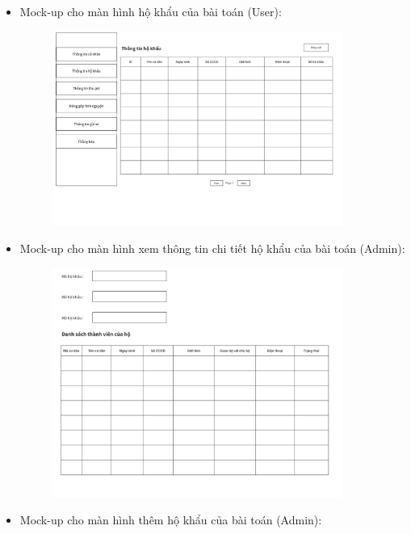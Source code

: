 \documentclass{article}
\begin{document}
\begin{itemize}
\begin{figure}[H]
    \end{figure}
    \newpage
    \item Mock-up cho màn hình hộ khẩu của bài toán (User):
    \begin{figure}[H]
        \centering
        \includegraphics[width=0.9\textwidth]{Ảnh chương 4/Màn hình hộ khẩu (cư dân).png}
    \end{figure}
    \item Mock-up cho màn hình xem thông tin chi tiết hộ khẩu của bài toán (Admin):
    \begin{figure}[H]
        \centering
        \includegraphics[width=0.9\textwidth]{Ảnh chương 4/Màn hình thông tin hộ khẩu (admin).png}
    \end{figure}
    \newpage
    \item Mock-up cho màn hình thêm hộ khẩu của bài toán (Admin):
    \begin{figure}[H]
        \centering

\end{figure}
\end{itemize}
\end{document}
